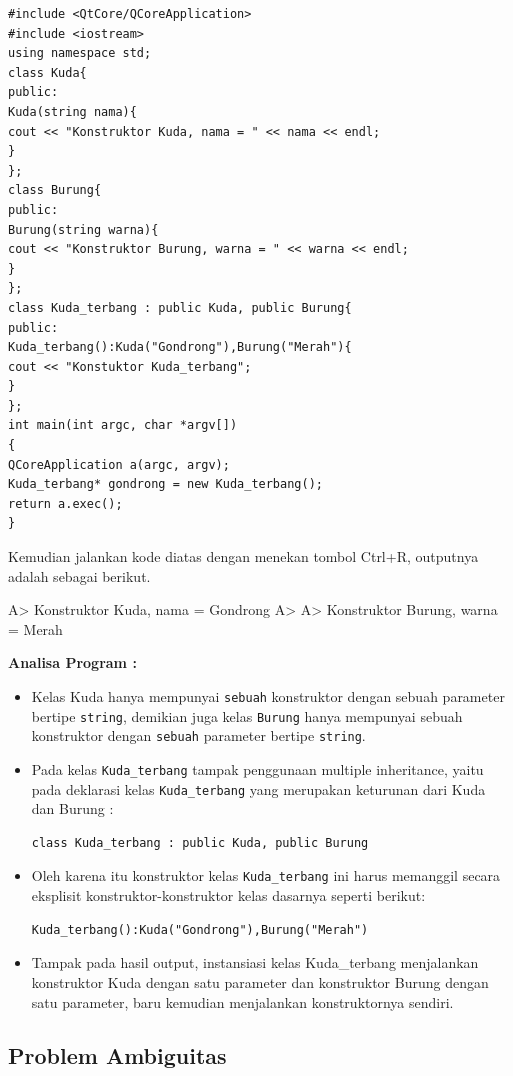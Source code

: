 \begin{verbatim}
#include <QtCore/QCoreApplication>
#include <iostream>
using namespace std;
class Kuda{
public:
Kuda(string nama){
cout << "Konstruktor Kuda, nama = " << nama << endl;
}
};
class Burung{
public:
Burung(string warna){
cout << "Konstruktor Burung, warna = " << warna << endl;
}
};
class Kuda_terbang : public Kuda, public Burung{
public:
Kuda_terbang():Kuda("Gondrong"),Burung("Merah"){
cout << "Konstuktor Kuda_terbang";
}
};
int main(int argc, char *argv[])
{
QCoreApplication a(argc, argv);
Kuda_terbang* gondrong = new Kuda_terbang();
return a.exec();
}
\end{verbatim}

Kemudian jalankan kode diatas dengan menekan tombol Ctrl+R, outputnya
adalah sebagai berikut.

A\textgreater{} Konstruktor Kuda, nama = Gondrong A\textgreater{}
A\textgreater{} Konstruktor Burung, warna = Merah

\textbf{Analisa Program :}

\begin{itemize}
\item
  Kelas Kuda hanya mempunyai \texttt{sebuah} konstruktor dengan sebuah
  parameter bertipe \texttt{string}, demikian juga kelas \texttt{Burung}
  hanya mempunyai sebuah konstruktor dengan \texttt{sebuah} parameter
  bertipe \texttt{string}.
\item
  Pada kelas \texttt{Kuda\_terbang} tampak penggunaan multiple
  inheritance, yaitu pada deklarasi kelas \texttt{Kuda\_terbang} yang
  merupakan keturunan dari Kuda dan Burung :

\begin{verbatim}
class Kuda_terbang : public Kuda, public Burung
\end{verbatim}
\item
  Oleh karena itu konstruktor kelas \texttt{Kuda\_terbang} ini harus
  memanggil secara eksplisit konstruktor-konstruktor kelas dasarnya
  seperti berikut:

\begin{verbatim}
Kuda_terbang():Kuda("Gondrong"),Burung("Merah")
\end{verbatim}
\item
  Tampak pada hasil output, instansiasi kelas Kuda\_terbang menjalankan
  konstruktor Kuda dengan satu parameter dan konstruktor Burung dengan
  satu parameter, baru kemudian menjalankan konstruktornya sendiri.
\end{itemize}

\subsection{Problem Ambiguitas}\label{problem-ambiguitas}

